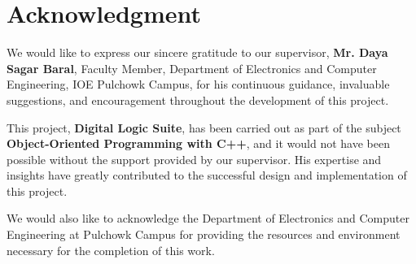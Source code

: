 \section*{Acknowledgment}

We would like to express our sincere gratitude to our supervisor, \textbf{Mr. Daya Sagar Baral}, Faculty Member, Department of Electronics and Computer Engineering, IOE Pulchowk Campus, for his continuous guidance, invaluable suggestions, and encouragement throughout the development of this project.

\vspace{0.5em}

This project, \textbf{Digital Logic Suite}, has been carried out as part of the subject \textbf{Object-Oriented Programming with C++}, and it would not have been possible without the support provided by our supervisor. His expertise and insights have greatly contributed to the successful design and implementation of this project.

\vspace{0.5em}

We would also like to acknowledge the Department of Electronics and Computer Engineering at Pulchowk Campus for providing the resources and environment necessary for the completion of this work.
